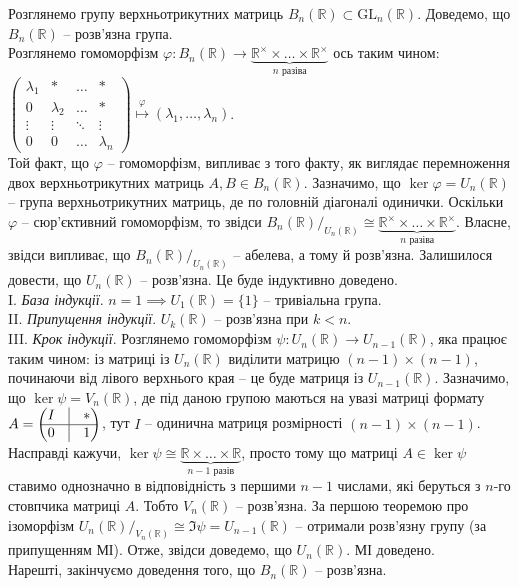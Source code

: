 \documentclass{math_library}
\begin{document}
\begin{example}
Розглянемо групу верхньотрикутних матриць $B_n(\mathbb{R}) \subset \mathrm{GL}_n(\mathbb{R})$. Доведемо, що $B_n(\mathbb{R})$ -- розв'язна група.\\
Розглянемо гомоморфізм $\varphi \colon B_n(\mathbb{R}) \to \underbrace{\mathbb{R}^{\times} \times \dots \times \mathbb{R}^{\times}}_{\text{$n$ разіва}}$ ось таким чином:\\
$\begin{pmatrix}
\lambda_1 & * & \dots & * \\
0 & \lambda_2 & \dots & * \\
\vdots & \vdots & \ddots & \vdots \\
0 & 0 & \dots & \lambda_n
\end{pmatrix} \overset{\varphi}{\mapsto} (\lambda_1,\dots,\lambda_n)$.\\
Той факт, що $\varphi$ -- гомоморфізм, випливає з того факту, як виглядає перемноження двох верхньотрикутних матриць $A,B \in B_n(\mathbb{R})$. Зазначимо, що $\ker \varphi = U_n(\mathbb{R})$ -- група верхньотрикутних матриць, де по головній діагоналі одинички. Оскільки $\varphi$ -- сюр'єктивний гомоморфізм, то звідси ${B_n(\mathbb{R})}/_{U_n(\mathbb{R})} \cong \underbrace{\mathbb{R}^{\times} \times \dots \times \mathbb{R}^{\times}}_{\text{$n$ разіва}}$. Власне, звідси випливає, що ${B_n(\mathbb{R})}/_{U_n(\mathbb{R})}$ -- абелева, а тому й розв'язна. Залишилося довести, що $U_n(\mathbb{R})$ -- розв'язна. Це буде індуктивно доведено.\\
I. \textit{База індукції}. $n = 1 \implies U_1(\mathbb{R}) = \{1\}$ -- тривіальна група.\\
II. \textit{Припущення індукції}. $U_k(\mathbb{R})$ -- розв'язна при $k < n$.\\
III. \textit{Крок індукції}. Розглянемо гомоморфізм $\psi \colon U_n(\mathbb{R}) \to U_{n-1}(\mathbb{R})$, яка працює таким чином: із матриці із $U_n(\mathbb{R})$ виділити матрицю $(n-1) \times (n-1)$, починаючи від лівого верхнього края -- це буде матриця із $U_{n-1}(\mathbb{R})$. Зазначимо, що $\ker \psi = V_n(\mathbb{R})$, де під даною групою маються на увазі матриці формату $A = \begin{pmatrix}
I & \vline & * \\
\hline
0 & \vline & 1
\end{pmatrix}$, тут $I$ -- одинична матриця розмірності $(n-1) \times (n-1)$. Насправді кажучи, $\ker \psi \cong \underbrace{\mathbb{R} \times \dots \times \mathbb{R}}_{\text{$n-1$ разів}}$, просто тому що матриці $A \in \ker \psi$ ставимо однозначно в відповідність з першими $n-1$ числами, які беруться з $n$-го стовпчика матриці $A$. Тобто $V_n(\mathbb{R})$ -- розв'язна. За першою теоремою про ізоморфізм ${U_n(\mathbb{R})}/_{V_n(\mathbb{R})} \cong \Im \psi = U_{n-1}(\mathbb{R})$ -- отримали розв'язну групу (за припущенням МІ). Отже, звідси доведемо, що $U_n(\mathbb{R})$. МІ доведено.\\
Нарешті, закінчуємо доведення того, що $B_n(\mathbb{R})$ -- розв'язна.
\end{example}
\end{document}
